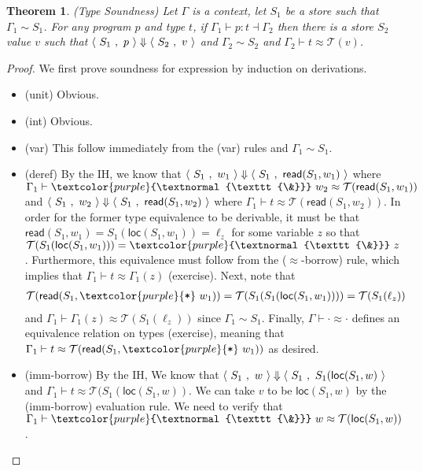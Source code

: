 \documentclass[10pt]{article}
\newcommand{\code}[1]{\textcolor{purple}{\textnormal{\texttt{#1}}}}
\newcommand{\etyj}[3]{#1 \vdash #2 : #3}
\newcommand{\evj}[3]{\langle \ #1 \ , \ #2 \ \rangle \Downarrow #3}
\newtheorem*{theorem}{Theorem}
\begin{document}
\begin{theorem}
  (Type Soundness)
  Let $\Gamma$ is a context, let $S_1$ be a store such that $\Gamma_1 \sim S_1$.
  For any program $p$ and type $t$, if $\etyj {\Gamma_1} p t \dashv \Gamma_2$ then there is a store $S_2$ value $v$ such that $\evj {S_1} p {\config {S_2} v}$ and $\Gamma_2 \sim S_2$ and $\Gamma_2 \vdash t \approx \mathcal T(v)$.
\end{theorem}

\begin{proof}
  We first prove soundness for expression by induction on derivations.
  \begin{itemize}
  \item (unit) Obvious.
  \item (int) Obvious.
  \item (var) This follow immediately from the (var) rules and $\Gamma_1 \sim S_1$.
  \item (deref)
    By the IH, we know that $\langle \ S_1 \ , \ w_1 \ \rangle \Downarrow \langle \ S_1 \ , \ \mathsf{read}(S_1, w_1) \ \rangle$ where $\Gamma_1 \vdash \code{\&} \ w_2 \approx \mathcal T(\mathsf{read}(S_1, w_1))$ and $\langle \ S_1 \ , \ w_2 \ \rangle \Downarrow \langle \ S_1 \ , \ \mathsf{read}(S_1, w_2) \ \rangle$ where $\Gamma_1 \vdash t \approx \mathcal T(\mathsf{read}(S_1, w_2))$.
    In order for the former type equivalence to be derivable, it must be that $\mathsf{read}(S_1, w_1) = S_1(\mathsf{loc}(S_1, w_1)) = \ell_z$ for some variable $z$ so that $\mathcal T(S_1(\mathsf{loc}(S_1, w_1))) = \code{\&} \ z$.
    Furthermore, this equivalence must follow from the ($\approx$-borrow) rule, which implies that $\Gamma_1 \vdash t \approx \Gamma_1(z)$ (exercise).
    Next, note that
    \begin{align*}
      \mathcal T(\mathsf{read}(S_1, \code{*} \ w_1)) =
      \mathcal T(S_1(S_1(\mathsf{loc}(S_1, w_1)))) =
      \mathcal T(S_1(\ell_z))
    \end{align*}
    and $\Gamma_1 \vdash \Gamma_1(z) \approx \mathcal T(S_1(\ell_z))$ since $\Gamma_1 \sim S_1$.
    Finally, $\Gamma \vdash \cdot \approx \cdot$ defines an equivalence relation on types (exercise), meaning that $\Gamma_1 \vdash t \approx \mathcal T(\mathsf{read}(S_1, \code{*} \ w_1))$ as desired.
  \item (imm-borrow)
    By the IH, We know that $\langle \ S_1 \ , \ w \ \rangle \Downarrow \langle \ S_1 \ , \ S_1(\mathsf{loc}(S_1, w) \ \rangle$ and $\Gamma_1 \vdash t \approx \mathcal T(S_1(\mathsf{loc}(S_1, w))$.
    We can take $v$ to be $\mathsf{loc}(S_1, w)$ by the (imm-borrow) evaluation rule.
    We need to verify that $\Gamma_1 \vdash \code{\&} \ w \approx \mathcal T(\mathsf{loc}(S_1, w))$.

\end{itemize}
\end{proof}
\end{document}
